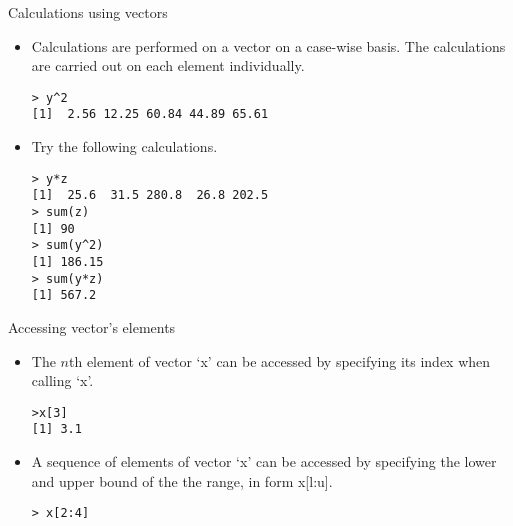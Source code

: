 \documentclass{beamer}
\begin{document}
\begin{frame}[fragile]{Calculations using vectors}

\begin{itemize}
\item Calculations are performed on a vector on a case-wise basis.
The calculations are carried out on each element individually.
\begin{verbatim}
> y^2
[1]  2.56 12.25 60.84 44.89 65.61
\end{verbatim}

\end{itemize}
\begin{itemize}
\item Try the following calculations.
\begin{verbatim}
> y*z
[1]  25.6  31.5 280.8  26.8 202.5
> sum(z)
[1] 90
> sum(y^2)
[1] 186.15
> sum(y*z)
[1] 567.2
\end{verbatim}
\end{itemize}
\end{frame}
\begin{frame}[fragile]{Accessing vector's elements}

\begin{itemize}
\item The $n$th element of vector `x' can be accessed by
specifying its index when calling `x'.
\begin{verbatim}
>x[3]
[1] 3.1
\end{verbatim}

\item A sequence of  elements of vector `x' can be accessed by
specifying the lower and upper bound of the the range, in form
x[l:u].
\begin{verbatim}
> x[2:4]
\end{verbatim}
\end{itemize}
\end{frame}


\end{document}
